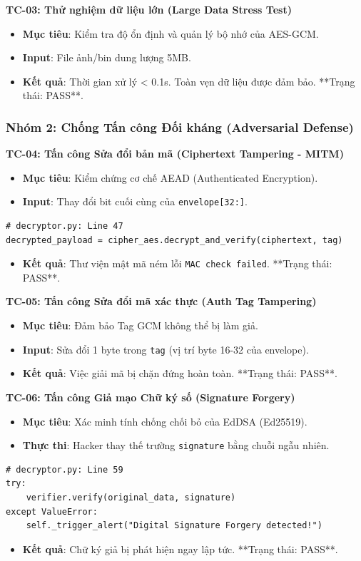 \documentclass[11pt,a4paper]{article}
\begin{document}
\textbf{TC-03: Thử nghiệm dữ liệu lớn (Large Data Stress Test)}
\begin{itemize}[noitemsep]
    \item \textbf{Mục tiêu}: Kiểm tra độ ổn định và quản lý bộ nhớ của AES-GCM.
    \item \textbf{Input}: File ảnh/bin dung lượng 5MB.
    \item \textbf{Kết quả}: Thời gian xử lý < 0.1s. Toàn vẹn dữ liệu được đảm bảo. **Trạng thái: PASS**.
\end{itemize}

\subsubsection{Nhóm 2: Chống Tấn công Đối kháng (Adversarial Defense)}

\textbf{TC-04: Tấn công Sửa đổi bản mã (Ciphertext Tampering - MITM)}
\begin{itemize}[noitemsep]
    \item \textbf{Mục tiêu}: Kiểm chứng cơ chế AEAD (Authenticated Encryption).
    \item \textbf{Input}: Thay đổi bit cuối cùng của \texttt{envelope[32:]}.
\end{itemize}
\begin{lstlisting}
# decryptor.py: Line 47
decrypted_payload = cipher_aes.decrypt_and_verify(ciphertext, tag)
\end{lstlisting}
\begin{itemize}
    \item \textbf{Kết quả}: Thư viện mật mã ném lỗi \texttt{MAC check failed}. **Trạng thái: PASS**.
\end{itemize}

\textbf{TC-05: Tấn công Sửa đổi mã xác thực (Auth Tag Tampering)}
\begin{itemize}[noitemsep]
    \item \textbf{Mục tiêu}: Đảm bảo Tag GCM không thể bị làm giả.
    \item \textbf{Input}: Sửa đổi 1 byte trong \texttt{tag} (vị trí byte 16-32 của envelope).
    \item \textbf{Kết quả}: Việc giải mã bị chặn đứng hoàn toàn. **Trạng thái: PASS**.
\end{itemize}

\textbf{TC-06: Tấn công Giả mạo Chữ ký số (Signature Forgery)}
\begin{itemize}[noitemsep]
    \item \textbf{Mục tiêu}: Xác minh tính chống chối bỏ của EdDSA (Ed25519).
    \item \textbf{Thực thi}: Hacker thay thế trường \texttt{signature} bằng chuỗi ngẫu nhiên.
\end{itemize}
\begin{lstlisting}
# decryptor.py: Line 59
try:
    verifier.verify(original_data, signature)
except ValueError:
    self._trigger_alert("Digital Signature Forgery detected!")
\end{lstlisting}
\begin{itemize}
    \item \textbf{Kết quả}: Chữ ký giả bị phát hiện ngay lập tức. **Trạng thái: PASS**.
\end{itemize}
\end{document}
